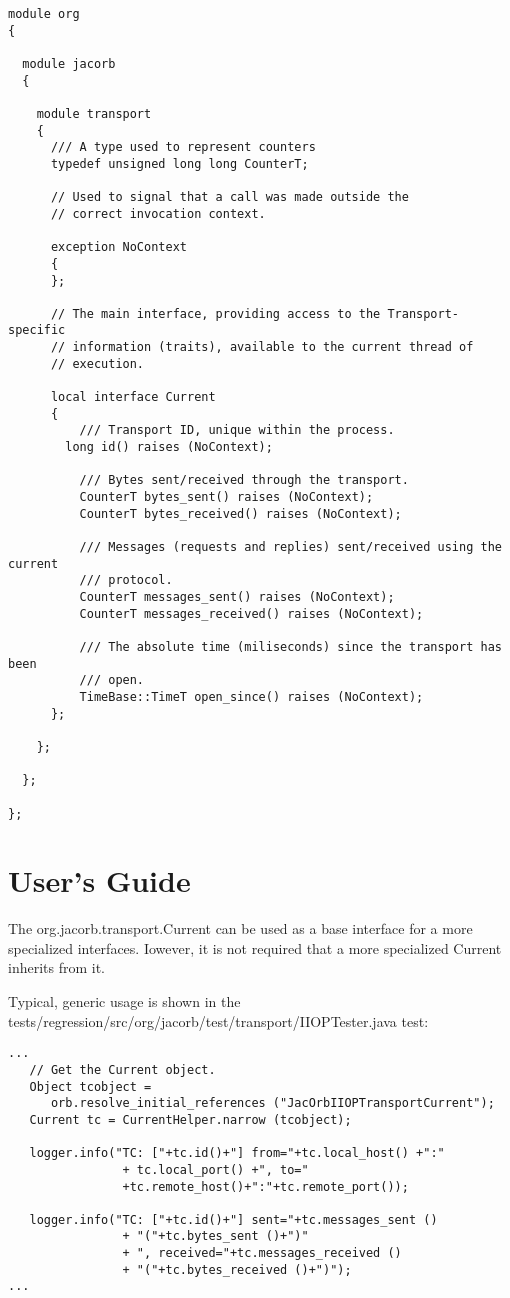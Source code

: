 \begin{verbatim}
module org
{

  module jacorb
  {

    module transport
    {
      /// A type used to represent counters
      typedef unsigned long long CounterT;

      // Used to signal that a call was made outside the
      // correct invocation context.

      exception NoContext
      {
      };

      // The main interface, providing access to the Transport-specific
      // information (traits), available to the current thread of
      // execution.

      local interface Current
      {
          /// Transport ID, unique within the process.
        long id() raises (NoContext);

          /// Bytes sent/received through the transport.
          CounterT bytes_sent() raises (NoContext);
          CounterT bytes_received() raises (NoContext);

          /// Messages (requests and replies) sent/received using the current
          /// protocol.
          CounterT messages_sent() raises (NoContext);
          CounterT messages_received() raises (NoContext);

          /// The absolute time (miliseconds) since the transport has been
          /// open.
          TimeBase::TimeT open_since() raises (NoContext);
      };

    };

  };

};
\end{verbatim}


\section{User's Guide}

The org.jacorb.transport.Current can be used as a base interface for a more 
specialized interfaces. Iowever, it is not required that a more specialized 
Current inherits from it. 

Typical, generic usage is shown in the 
tests/regression/src/org/jacorb/test/transport/IIOPTester.java test: 

\begin{verbatim}
...
   // Get the Current object.
   Object tcobject = 
      orb.resolve_initial_references ("JacOrbIIOPTransportCurrent");
   Current tc = CurrentHelper.narrow (tcobject);

   logger.info("TC: ["+tc.id()+"] from="+tc.local_host() +":"
                + tc.local_port() +", to=" 
                +tc.remote_host()+":"+tc.remote_port());

   logger.info("TC: ["+tc.id()+"] sent="+tc.messages_sent ()
                + "("+tc.bytes_sent ()+")"
                + ", received="+tc.messages_received ()
                + "("+tc.bytes_received ()+")");
...
\end{verbatim}

